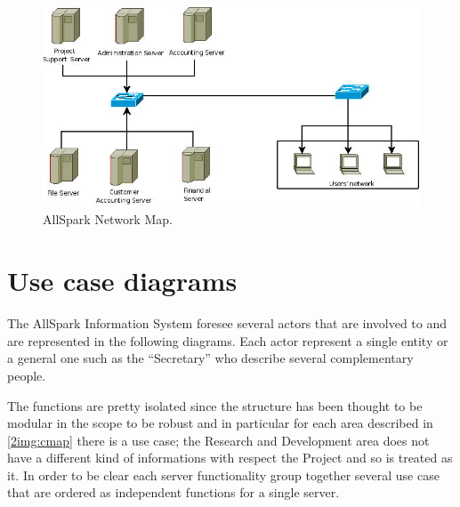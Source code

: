 \begin{figure}
\begin{centering}
\includegraphics[scale=0.45]{assign3/dia/NetMap.jpeg}
\caption{AllSpark Network Map.}
\label{2img:NetMap}
\end{centering}
\end{figure}


\section{Use case diagrams}
The AllSpark Information System foresee several actors that are involved to and are represented in the following diagrams. Each actor represent a single entity or a general one such as the ``Secretary'' who describe several complementary people.

The functions are pretty isolated since the structure has been thought to be modular in the scope to be robust and in particular for each area described in \ref{2img:cmap} there is a use case; the Research and Development area does not have a different kind of informations with respect the Project and so is treated as it. In order to be clear each server functionality group together several use case that are ordered as independent functions for a single server.
 
 


